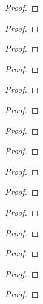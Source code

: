 \begin{problem}

\end{problem}
\begin{proof}
\end{proof}
\begin{problem}
\end{problem}
\begin{proof}
\end{proof}
\begin{problem}
\end{problem}
\begin{proof}
\end{proof}
\begin{problem}
\end{problem}
\begin{proof}
\end{proof}
\begin{problem}
\end{problem}
\begin{proof}
\end{proof}
\begin{problem}
\end{problem}
\begin{proof}
\end{proof}
\begin{problem}
\end{problem}
\begin{proof}
\end{proof}
\begin{problem}
\end{problem}
\begin{proof}
\end{proof}
\begin{problem}
\end{problem}
\begin{proof}
\end{proof}
\begin{problem}
\end{problem}
\begin{proof}
\end{proof}
\begin{problem}
\end{problem}
\begin{proof}
\end{proof}
\begin{problem}
\end{problem}
\begin{proof}
\end{proof}
\begin{problem}
\end{problem}
\begin{proof}
\end{proof}
\begin{problem}
\end{problem}
\begin{proof}
\end{proof}
\begin{problem}
\end{problem}
\begin{proof}
\end{proof}

